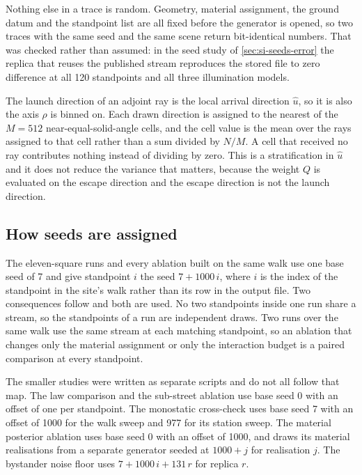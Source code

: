 \documentclass[journal]{IEEEtran}
\newcommand{\uloc}{\hat{u}}
\begin{document}
Nothing else in a trace is random. Geometry, material assignment, the ground
datum and the standpoint list are all fixed before the generator is opened, so
two traces with the same seed and the same scene return bit-identical numbers.
That was checked rather than assumed: in the seed study of
\cref{sec:si-seeds-error} the replica that reuses the published stream
reproduces the stored file to zero difference at all 120 standpoints and all
three illumination models.

The launch direction of an adjoint ray is the local arrival direction
$\uloc$, so it is also the axis $\rho$ is binned on. Each drawn direction is
assigned to the nearest of the $M = 512$ near-equal-solid-angle cells, and the
cell value is the mean over the rays assigned to that cell rather than a sum
divided by $N/M$. A cell that received no ray contributes nothing instead of
dividing by zero. This is a stratification in $\uloc$ and it does not reduce the
variance that matters, because the weight $Q$ is evaluated on the escape
direction and the escape direction is not the launch direction.

\subsection{How seeds are assigned}

The eleven-square runs and every ablation built on the same walk use one base
seed of 7 and give standpoint $i$ the seed $7 + 1000\,i$, where $i$ is the index
of the standpoint in the site's walk rather than its row in the output file.
Two consequences follow and both are used. No two standpoints inside one run
share a stream, so the standpoints of a run are independent draws. Two runs over
the same walk use the same stream at each matching standpoint, so an ablation
that changes only the material assignment or only the interaction budget is a
paired comparison at every standpoint.

The smaller studies were written as separate scripts and do not all follow that
map. The law comparison and the sub-street ablation use base seed 0 with an
offset of one per standpoint. The monostatic cross-check uses base seed 7 with
an offset of 1000 for the walk sweep and 977 for its station sweep. The material
posterior ablation uses base seed 0 with an offset of 1000, and draws its
material realisations from a separate generator seeded at $1000 + j$ for
realisation $j$. The bystander noise floor uses $7 + 1000\,i + 131\,r$ for
replica $r$.
\end{document}
